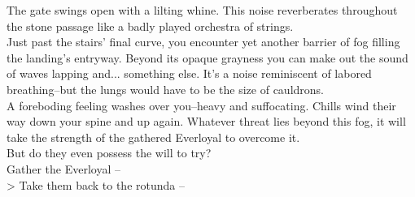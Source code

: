 The gate swings open with a lilting whine. This noise reverberates throughout the stone passage like a badly played orchestra of strings.\\

Just past the stairs' final curve, you encounter yet another barrier of fog filling the landing's entryway. Beyond its opaque grayness you can make out the sound of waves lapping and... something else. It's a noise reminiscent of labored breathing--but the lungs would have to be the size of cauldrons.\\

A foreboding feeling washes over you--heavy and suffocating. Chills wind their way down your spine and up again. Whatever threat lies beyond this fog, it will take the strength of the gathered Everloyal to overcome it.\\

But do they even possess the will to try?\\

 Gather the Everloyal -- \\ 
> Take them back to the rotunda -- 